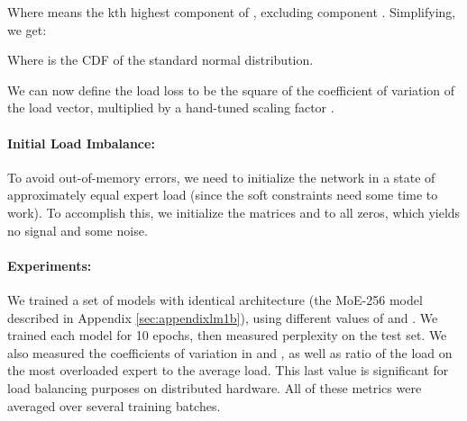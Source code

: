 \documentclass{article} \pdfoutput=1
\begin{document}
Where  means the kth highest component of , excluding component .  Simplifying, we get:



Where  is the CDF of the standard normal distribution.



We can now define the load loss to be the square of the coefficient of variation of the load vector, multiplied by a hand-tuned scaling factor .



\paragraph{Initial Load Imbalance:}  To avoid out-of-memory errors, we need to initialize the network in a state of approximately equal expert load (since the soft constraints need some time to work).  To accomplish this, we initialize the matrices  and  to all zeros, which yields no signal and some noise.

\paragraph{Experiments:} We trained a set of models with identical architecture (the MoE-256 model described in Appendix \ref{sec:appendixlm1b}), using different values of  and .  We trained each model for 10 epochs, then measured perplexity on the test set.  We also measured the coefficients of variation in  and , as well as ratio of the load on the most overloaded expert to the average load.  This last value is significant for load balancing purposes on distributed hardware.  All of these metrics were averaged over several training batches.


\begin{table}[h!]
\caption{Experiments with different combinations of losses. }
\label{tab:losses}
\begin{center}
\setlength\tabcolsep{3pt}
\end{center}
\end{table}
\end{document}
